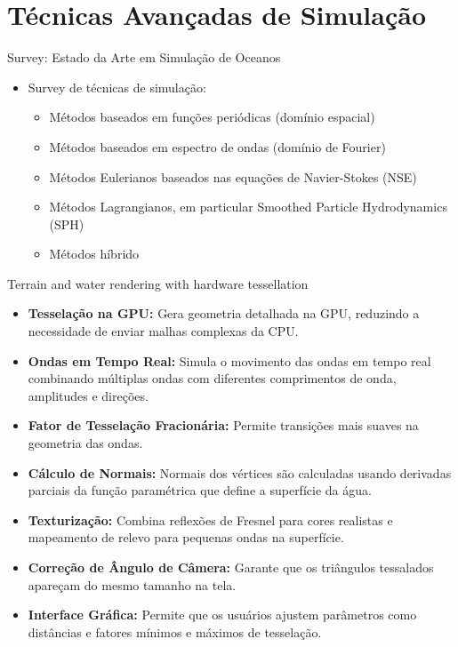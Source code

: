 \documentclass[aspectratio=169,xcolor=table]{beamer}
\begin{document}
\section{Técnicas Avançadas de Simulação}
\begin{frame}{Survey: Estado da Arte em Simulação de Oceanos}
    \begin{itemize}
        \item Survey de técnicas de simulação:
        \begin{itemize}
            \item Métodos baseados em funções periódicas (domínio espacial)
            \item Métodos baseados em espectro de ondas (domínio de Fourier)
            \item Métodos Eulerianos baseados nas equações de Navier-Stokes (NSE)
            \item Métodos Lagrangianos, em particular Smoothed Particle Hydrodynamics (SPH)
            \item Métodos híbrido
        \end{itemize}
    \end{itemize}
\end{frame}
\begin{frame}{Terrain and water rendering with hardware tessellation}
    \begin{itemize}
        \item \textbf{Tesselação na GPU:} Gera geometria detalhada na GPU, reduzindo a necessidade de enviar malhas complexas da CPU.
        \item \textbf{Ondas em Tempo Real:} Simula o movimento das ondas em tempo real combinando múltiplas ondas com diferentes comprimentos de onda, amplitudes e direções.
        \item \textbf{Fator de Tesselação Fracionária:} Permite transições mais suaves na geometria das ondas.
        \item \textbf{Cálculo de Normais:} Normais dos vértices são calculadas usando derivadas parciais da função paramétrica que define a superfície da água.
        \item \textbf{Texturização:} Combina reflexões de Fresnel para cores realistas e mapeamento de relevo para pequenas ondas na superfície.
        \item \textbf{Correção de Ângulo de Câmera:} Garante que os triângulos tessalados apareçam do mesmo tamanho na tela.
        \item \textbf{Interface Gráfica:} Permite que os usuários ajustem parâmetros como distâncias e fatores mínimos e máximos de tesselação.
    \end{itemize}
\end{frame}
\end{document}
